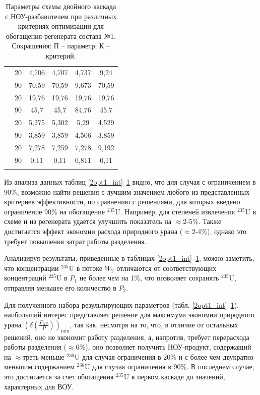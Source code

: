 \begin{table}[ht]
\begin{tabular}{|r|r||c|c|c|c|}
        \Xhline{2\arrayrulewidth}
        \multirow{2}{*}{$C_{235,W_{2}}, \%$}
            & 20 & 4,706 & 4,707 & 4,737 & 9,24 \\\cline{2-6} 
            & 90 & 70,59 & 70,59 & 9,673 & 70,59\\
    \Xhline{2\arrayrulewidth}
        \multirow{2}{*}{$C_{235,P_{2}}, \%$}
            & 20 & 19,76 & 19,76 & 19,76 & 19,76 \\\cline{2-6} 
            & 90 & 45,7 & 45,7 & 84,76 & 45,7\\
        \Xhline{2\arrayrulewidth}
        \multirow{2}{*}{$C_{235,P_{n}}, \%$}
            & 20 & 5,275 & 5,302 & 5,29 & 4,529 \\\cline{2-6} 
            & 90 & 3,859 & 3,859 & 4,506 & 3,859\\
        \Xhline{2\arrayrulewidth}           
        \multirow{2}{*}{$P_2$, кг}
        & 20 & 7,278 & 7,259 & 7,278 & 9,192 \\\cline{2-6} 
        & 90 & 0,11 & 0,11 & 0,811 & 0,11\\
\Xhline{2\arrayrulewidth}
        \end{tabular}
        \caption{Параметры схемы двойного каскада с НОУ-разбавителем при различных критериях оптимизации для обогащения регенерата состава №1. Сокращения: П -- параметр; К -- критерий.{\label{2opt1}}}
\end{table}


Из анализа данных таблиц \ref{2opt1_int}--\ref{2opt1} видно, что для случая с ограничением в 90\%, возможно найти решения с лучшим значением любого из представленных критериев эффективности, по сравнению с решениями, для которых введено ограничение 90\% на обогащение $^{235}$U. Например, для степеней извлечения $^{235}$U в схеме и из регенерата удается улучшить показатель на $\approx$2-5\%. Также достигается эффект  экономии расхода природного урана ($\approx$2-4\%), однако это требует повышения затрат работы разделения.

Анализируя результаты, приведенные в таблицах \ref{2opt1_int}--\ref{2opt1}, можно заметить, что концентрации $^{235}$U в потоке $W_2$ отличаются от соответствующих концентраций $^{235}$U в  $P_1$ не более чем на 1\%, что позволяет сохранять $^{235}$U, отправляя меньшее его количество в $P_2$.

Для полученного набора результирующих параметров (табл. \ref{2opt1_int}--\ref{2opt1}), наибольший интерес представляет решение для максимума экономии природного урана $(\delta(\frac{F_{NU}}{P}))_\text{min}$, так как, несмотря на то, что, в отличие от остальных решений, оно не экономит работу разделения, а, напротив, требует перерасхода работы разделения ($\approx$6\%), оно позволяет получить НОУ-продукт, содержащий на $\approx$треть меньше $^{236}$U для случая ограничения в 20\% и с более чем двукратно меньшим содержанием $^{236}$U для случая ограничения в 90\%. В последнем случае, это достигается за счет обогащения $^{235}$U в первом каскаде до значений, характерных для ВОУ.


